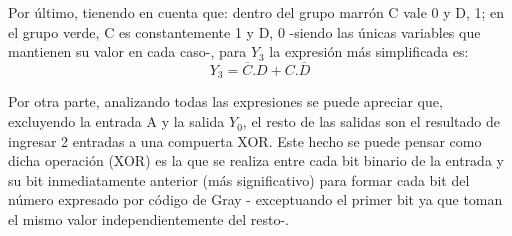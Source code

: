 \noindent
Por \'ultimo, tienendo en cuenta que: dentro del grupo marr\'on C vale 0 y D, 1; en el grupo verde, C es constantemente 1 y D, 0 -siendo las \'unicas variables que mantienen su valor en cada caso-, para $Y_3$ la expresi\'on m\'as simplificada es: 
 \begin{equation}
 Y_3 = \overline{C}.D
 + C.\overline{D}
     \label{ecy3}
 \end{equation}

\noindent
Por otra parte, analizando todas las expresiones se puede apreciar que, excluyendo la entrada A y la salida $Y_0$, el resto de las salidas son el resultado de ingresar 2 entradas a una compuerta XOR. Este hecho se puede pensar como dicha operaci\'on (XOR) es la que se realiza entre cada bit binario de la entrada y su bit inmediatamente anterior (m\'as significativo) para formar cada bit del n\'umero expresado por c\'odigo de Gray - exceptuando el primer bit ya que toman el mismo valor independientemente del resto-.
